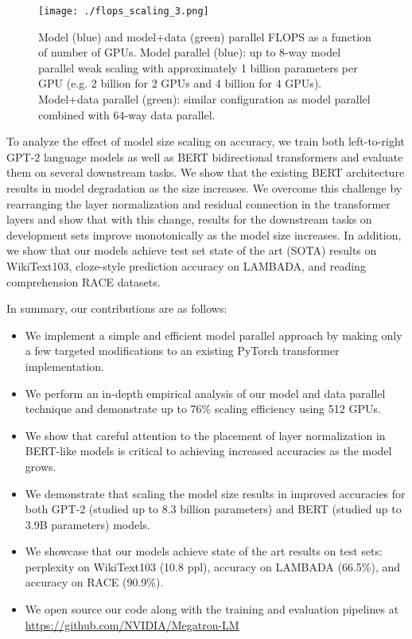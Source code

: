 \documentclass{article}
\begin{document}
\begin{figure}
\begin{center}
 \texttt{[image: ./flops\_scaling\_3.png]}
 \caption{Model (blue) and model+data (green) parallel FLOPS as a function of number of GPUs. Model parallel (blue): up to 8-way model parallel weak scaling with approximately 1 billion parameters per GPU (e.g. 2 billion for 2 GPUs and 4 billion for 4 GPUs). Model+data parallel (green): similar configuration as model parallel combined with 64-way data parallel.}
 \label{fig:scale_line}
\end{center}
\end{figure}
    
To analyze the effect of model size scaling on accuracy, we train both left-to-right GPT-2 \cite{Radford2019GPT2} language models as well as BERT \cite{devlin2018bert} bidirectional transformers and evaluate them on several downstream tasks. We show that the existing BERT architecture results in model degradation as the size increases. We overcome this challenge by rearranging the layer normalization and residual connection in the transformer layers and show that with this change, results for the downstream tasks  on development sets improve monotonically as the model size increases. In addition, we show that our models achieve test set state of the art (SOTA) results on WikiText103, cloze-style prediction accuracy on LAMBADA, and reading comprehension RACE datasets.
    

In summary, our contributions are as follows:
\begin{itemize}
    \item We implement a simple and efficient model parallel approach by making only a few targeted modifications to an existing PyTorch transformer implementation.
    \item We perform an in-depth empirical analysis of our model and data parallel technique and demonstrate up to 76\% scaling efficiency using 512 GPUs.
    \item We show that careful attention to the placement of layer normalization in BERT-like models is critical to achieving increased accuracies as the model grows.
    \item We demonstrate that scaling the model size results in improved accuracies for both GPT-2 (studied up to 8.3 billion parameters) and BERT (studied up to 3.9B parameters) models.
    \item We showcase that our models achieve state of the art results on test sets: perplexity on WikiText103 (10.8 ppl), accuracy on LAMBADA (66.5\%), and accuracy on RACE (90.9\%).
    \item We open source our code along with the training and evaluation pipelines at \url{https://github.com/NVIDIA/Megatron-LM}
\end{itemize}
\end{document}
